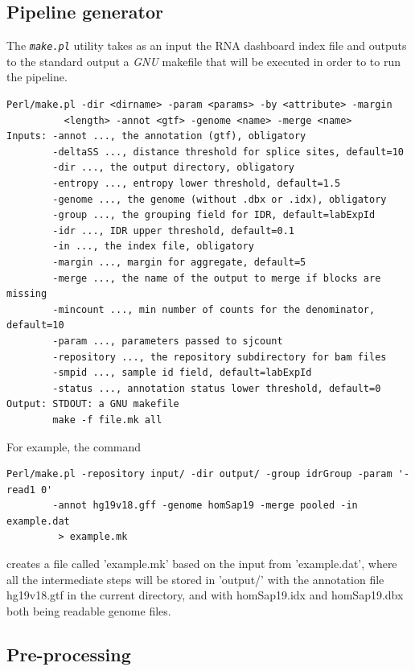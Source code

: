 \documentclass{article}
\newcommand{\prog}[1]{{\tt\em #1}}
\begin{document}
\subsection{Pipeline generator}
The \prog{make.pl} utility takes as an input the RNA dashboard index file and outputs to the standard output a {\em GNU} makefile that 
will be executed in order to to run the pipeline.
\begin{verbatim} 
Perl/make.pl -dir <dirname> -param <params> -by <attribute> -margin 
          <length> -annot <gtf> -genome <name> -merge <name>
Inputs: -annot ..., the annotation (gtf), obligatory
        -deltaSS ..., distance threshold for splice sites, default=10
        -dir ..., the output directory, obligatory
        -entropy ..., entropy lower threshold, default=1.5
        -genome ..., the genome (without .dbx or .idx), obligatory
        -group ..., the grouping field for IDR, default=labExpId
        -idr ..., IDR upper threshold, default=0.1
        -in ..., the index file, obligatory
        -margin ..., margin for aggregate, default=5
        -merge ..., the name of the output to merge if blocks are missing
        -mincount ..., min number of counts for the denominator, default=10
        -param ..., parameters passed to sjcount
        -repository ..., the repository subdirectory for bam files
        -smpid ..., sample id field, default=labExpId
        -status ..., annotation status lower threshold, default=0
Output: STDOUT: a GNU makefile
        make -f file.mk all
\end{verbatim} 

For example, the command
\begin{verbatim}
Perl/make.pl -repository input/ -dir output/ -group idrGroup -param '-read1 0' 
        -annot hg19v18.gff -genome homSap19 -merge pooled -in example.dat 
         > example.mk
\end{verbatim}
creates a file called 'example.mk' based on the input from 'example.dat', where all the intermediate steps will be stored in 'output/' 
with the annotation file hg19v18.gtf in the current directory, and with homSap19.idx and homSap19.dbx both being readable genome files.


\subsection{Pre-processing}
\end{document}
